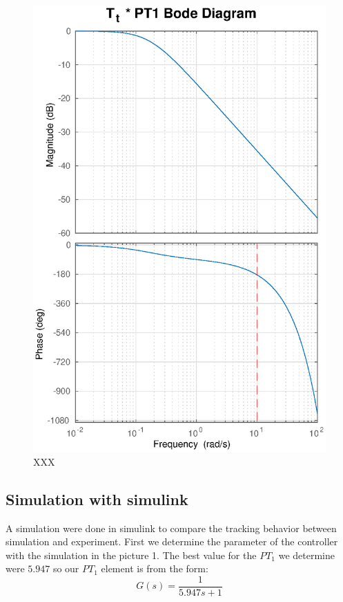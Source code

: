 \begin{figure}
    \centering
    \includegraphics[width=\linewidth]{images/Tt_PT1_bode}
    \caption{XXX}
\end{figure}

\subsection{Simulation with simulink}
A simulation were done in simulink to compare the tracking behavior between simulation and experiment.
First we determine the parameter of the controller with the simulation in the picture 1.
The best value for the $PT_{1}$ we determine were $5.947$
so our $PT_{1}$ element is from the form:
\begin{equation}
G(s) = \frac{1}{5.947s+1}
\end{equation}



